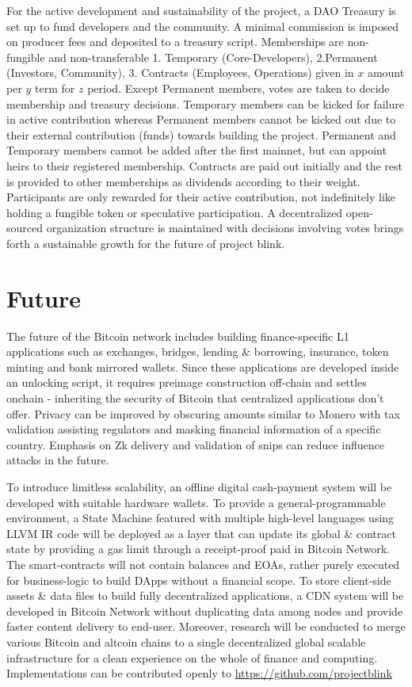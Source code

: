 \documentclass[a4paper,10pt]{article}
\begin{document}
For the active development and sustainability of the project, a DAO Treasury is set up to fund developers and the community. A minimal commission is imposed on producer fees and deposited to a treasury script. Memberships are non-fungible and non-transferable 1. Temporary (Core-Developers), 2.Permanent (Investors, Community), 3. Contracts (Employees, Operations) given in $x$ amount per $y$ term for $z$ period. Except Permanent members, votes are taken to decide membership and treasury decisions. Temporary members can be kicked for failure in active contribution whereas Permanent members cannot be kicked out due to their external contribution (funds) towards building the project. Permanent and Temporary members cannot be added after the first mainnet, but can appoint heirs to their registered membership. Contracts are paid out initially and the rest is provided to other memberships as dividends according to their weight. Participants are only rewarded for their active contribution, not indefinitely like holding a fungible token or speculative participation. A decentralized open-sourced organization structure is maintained with decisions involving votes brings forth a sustainable growth for the future of project blink.

\section{Future}

The future of the Bitcoin network includes building finance-specific L1 applications such as exchanges, bridges, lending \& borrowing, insurance, token minting and bank mirrored wallets. Since these applications are developed inside an unlocking script, it requires preimage construction off-chain and settles onchain - inheriting the security of Bitcoin that centralized applications don't offer. Privacy can be improved by obscuring amounts similar to Monero with tax validation assisting regulators and masking financial information of a specific country. Emphasis on Zk delivery and validation of snips can reduce influence attacks in the future. 

To introduce limitless scalability, an offline digital cash-payment system will be developed with suitable hardware wallets. To provide a general-programmable environment, a State Machine featured with multiple high-level languages using LLVM \cite{llvm} IR code will be deployed as a layer that can update its global \& contract state by providing a gas limit through a receipt-proof paid in Bitcoin Network. The smart-contracts will not contain balances and EOAs, rather purely executed for business-logic to build DApps without a financial scope. To store client-side assets \& data files to build fully decentralized applications, a CDN system will be developed in Bitcoin Network without duplicating data among nodes and provide faster content delivery to end-user. Moreover, research will be conducted to merge various Bitcoin and altcoin chains to a single decentralized global scalable infrastructure for a clean experience on the whole of finance and computing.\\

\noindent Implementations can be contributed openly to \url{https://github.com/projectblink}



\end{document}
